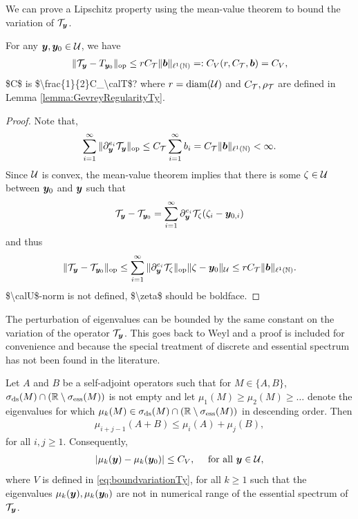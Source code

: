 We can prove a Lipschitz property using the mean-value theorem to bound the variation of $\mathcal{T}_{{\boldsymbol{y}}}$. 
\begin{lemma}\label{lemma:variationboundTy}
    For any $ {\boldsymbol{y}}, {\boldsymbol{y}}_0 \in \mathcal{U}$, we have
    \begin{align}\label{eq:boundvariationTy}
        \| \mathcal{T}_{{\boldsymbol{y}}} - T_{{\boldsymbol{y}}_0} \|_{\mathrm{op}} \leq r  C_{\mathcal{T}}\| {\boldsymbol{b}} \|_{\ell^1(\mathbb{N})} =: C_V(r,C_{\mathcal{T}},{\boldsymbol{b}})= C_V,
    \end{align}
   \ac{$C$ is $\frac{1}{2}C_\calT$?} where $r = \text{diam}(\mathcal{U})$ and $C_{\mathcal{T}},\rho_{\mathcal{T}}$ are defined in Lemma \ref{lemma:GevreyRegularityTy}.
\end{lemma}
\begin{proof}
    Note that, 
   \begin{align*}
        \sum_{i=1}^\infty  \| \partial^{e_i}_{{\boldsymbol{y}}} \mathcal{T}_{{\boldsymbol{y}}} \|_{\mathrm{op}} \leq  C_{\mathcal{T}}\sum_{i=1}^\infty  b_i =  C_{\mathcal{T}} \| {\boldsymbol{b}} \|_{\ell^1(\mathbb{N})} < \infty.
   \end{align*} 
   Since $\calU$ is convex, the mean-value theorem 
  implies that there is some $\zeta \in \mathcal{U}$ between ${\boldsymbol{y}}_0$ and ${\boldsymbol{y}}$ such that 
   \begin{align*}
       \mathcal{T}_{{\boldsymbol{y}}} - \mathcal{T}_{{\boldsymbol{y}}_0} = \sum_{i=1}^\infty \partial^{e_i}_{{\boldsymbol{y}}} \mathcal{T}_{\zeta} (\zeta_i - {\boldsymbol{y}}_{0,i})
   \end{align*}
   and thus
   \begin{align*}
       \| \mathcal{T}_{{\boldsymbol{y}}} - \mathcal{T}_{{\boldsymbol{y}}_0} \|_{\mathrm{op}}  \leq  \sum_{i=1}^\infty  \| \partial^{e_i}_{{\boldsymbol{y}}} \mathcal{T}_{\zeta} \|_{\mathrm{op}}  \| \zeta - {\boldsymbol{y}}_0 \|_{\mathcal{U}} 
        \leq  r C_{\mathcal{T}}\| {\boldsymbol{b}} \|_{\ell^1(\mathbb{N})}.
   \end{align*}
   \ac{$\calU$-norm is not defined, $\zeta$ should be boldface.}
\end{proof}
The perturbation of eigenvalues can be bounded by the same constant on the variation of the operator $\mathcal{T}_{\boldsymbol{y}}$. This goes back to Weyl and a proof is included for convenience and because the special treatment of discrete and essential spectrum has not been found in the literature.
\begin{lemma}\label{lemma:Weylsinequality}
Let $A$ and $B$ be a self-adjoint operators such that for $M \in \{A,B\} $, $\sigma_{\mathrm{ds}} (M)\cap (\mathbb{R} \setminus \sigma_{\mathrm{ess}}(M))$ is not empty and 
let $\mu_1(M) \geq \mu_2(M)  \geq \ldots $ denote the eigenvalues  for which $\mu_k(M) \in \sigma_{\mathrm{ds}} (M)\cap (\mathbb{R} \setminus \sigma_{\mathrm{ess}}(M))$ in descending order. 
Then
\begin{align*}
    \mu_{i +j -1}(A+ B) \leq \mu_i(A) +  \mu_{j}(B),
\end{align*}
for all $i,j \geq 1$.
Consequently,
\begin{align*}
    \vert \mu_{k} ({\boldsymbol{y}})- \mu_k({\boldsymbol{y}}_0) \vert \leq C_V, \quad  \text{ for all } {\boldsymbol{y}} \in \mathcal{U},
\end{align*}
where $V$ is defined in \eqref{eq:boundvariationTy}, for all $k  \geq 1$ such that the eigenvalues $\mu_k({\boldsymbol{y}}) ,\mu_k({\boldsymbol{y}}_0) $ are not in numerical range of the essential spectrum of $\mathcal{T}_{\boldsymbol{y}}$.
\end{lemma}
